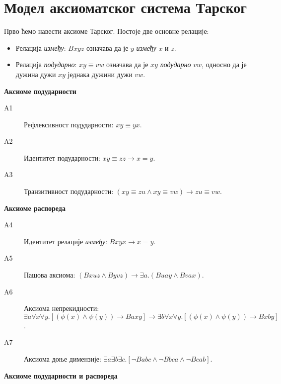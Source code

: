 \section{Модел аксиоматског система Тарског}
\label{sec:tarski}

Прво ћемо навести аксиоме Тарског. Постоје две основне релације:
\begin{itemize}
\item Релација \emph{између}: $Bxyz$ означава да је $y$ \emph{између}
  $x$ и $z$.
\item Релација \emph{подударно}: $xy \equiv vw$ означава да је $xy$
  \emph{подударно} $vw$, односно да је дужина дужи $xy$ једнака дужини
  дужи $vw$.
\end{itemize}

\noindent \textbf{Аксиоме подударности}

\begin{description}
\item[A1] Рефлексивност подударности: $xy \equiv yx$.
\item[A2] Идентитет подударности: $xy \equiv zz \to x = y$.
\item[A3] Транзитивност подударности: $(xy \equiv zu \land xy \equiv vw) \to zu \equiv vw$.
\end{description}

\noindent \textbf{Аксиоме распореда}

\begin{description}
\item[A4] Идентитет релације \emph{између}: $Bxyx \to x = y$.
\item[A5] Пашова аксиома: $(Bxuz \land Byvz) \to \exists a. (Buay \land Bvax)$.
\item[A6] Аксиома непрекидности: \\
  $\exists a\forall x\forall y. [(\phi(x) \land \psi(y)) \to Baxy] \to \exists b\forall x\forall y.[(\phi(x) \land \psi(y)) \to Bxby]$.
\item[A7] Аксиома доње димензије: $\exists a\exists b\exists c.[\neg Babc \land \neg Bbca \land \neg Bcab]$.
\end{description}

\noindent \textbf{Аксиоме подударности и распореда}

